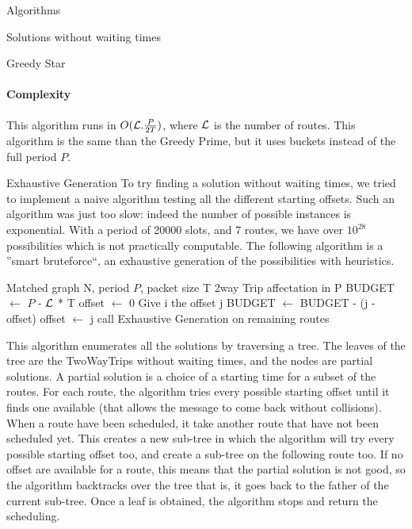 \documentclass[a4paper,10pt]{report}
\begin{document}
\begin{chapter}{Algorithms}
\begin{section}{Solutions without waiting times}
\begin{subsection}{Greedy Star}
\paragraph{Complexity}
This algorithm runs in $O({\cal L} . \frac{P}{2T})$, where ${\cal L}$ is the number of routes.
This algorithm is the same than the Greedy Prime, but it uses buckets instead of the full period $P$.
\end{subsection}


\begin{subsection}{Exhaustive Generation}
 To try finding a solution without waiting times, we tried to implement a naive algorithm testing all the different starting offsets.
 Such an algorithm was just too slow: indeed the number of possible instances is exponential. With a period of 20000 slots,
 and 7 routes, we have over $10^{28}$ possibilities which is not practically computable.
 The following algorithm is a ''smart bruteforce``, an exhaustive generation of the possibilities with heuristics.
 
\begin{algorithm}[H]
\caption{Exhaustive Generation}
\begin{algorithmic}
\REQUIRE Matched graph N, period $P$, packet size T
\ENSURE 2way Trip affectation in P
\STATE BUDGET $\leftarrow$ $P$ - ${\cal L}$ * T
\STATE offset $\leftarrow$ 0
\STATE Give i the offset j
\STATE BUDGET $\leftarrow$ BUDGET - (j - offset)
\STATE offset $\leftarrow$ j
\STATE call Exhaustive Generation on remaining routes
\ENDIF
\ENDFOR
\ENDFOR


\end{algorithmic}
\end{algorithm}

This algorithm enumerates all the solutions by traversing a tree. The leaves of the tree are 
the TwoWayTrips without waiting times, and the nodes are partial solutions. A partial solution is a choice of a starting time for a subset of the routes.
For each route, the algorithm tries every possible starting offset until it finds one available (that allows the message to come back without collisions). When a route have been scheduled, it take another route that have not been scheduled yet.
This creates a new sub-tree in which the algorithm will try every possible starting offset too, and create a sub-tree on the following route too.
If no offset are available for a route, this means that the partial solution is not good, so the algorithm backtracks over the tree that is,
it goes back to the father of the current sub-tree.
Once a leaf is obtained, the algorithm stops and return the scheduling.


\end{subsection}
\end{section}
\end{chapter}
\end{document}
